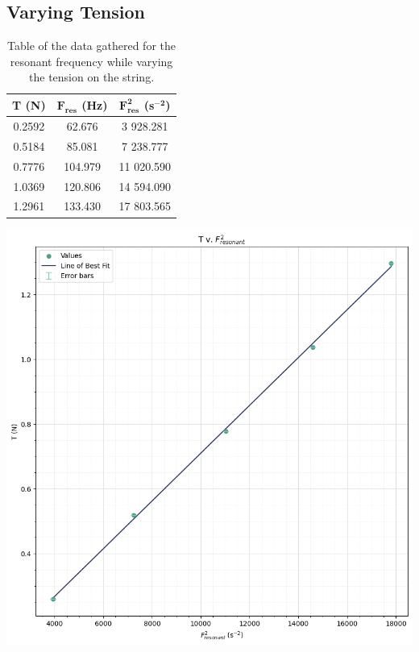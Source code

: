 \documentclass[12pt]{article}
\begin{document}
\subsection{Varying Tension}

\begin{minipage}{.45\textwidth}
    \captionsetup{hypcap=false}
\begin{table}[H]
    \centering
    \begin{tabular}{|c|c|c|}
    \hline
    \textbf{T (N)} & \textbf{$\mathbf{F_{res}}$ (Hz)} & \textbf{$\mathbf{F_{res}^2}$ (s$\mathbf{^{-2}}$)} \\ \hline
    0.2592 & 62.676  & 3 928.281  \\ \hline
    0.5184 & 85.081  & 7 238.777  \\ \hline
    0.7776 & 104.979 & 11 020.590 \\ \hline
    1.0369 & 120.806 & 14 594.090 \\ \hline
    1.2961 & 133.430 & 17 803.565 \\ \hline
    \end{tabular}
    \caption{\centering Table of the data gathered for the resonant frequency while varying the tension on the string.}
    \label{tab:2}
\end{table}
\end{minipage}
\hfill
\begin{minipage}{.5\textwidth}
    \captionsetup{hypcap=false}
    \includegraphics[width=\linewidth]{waves tension graph.png}
    \label{fig:tensiongraph}
\end{minipage}
\end{document}
